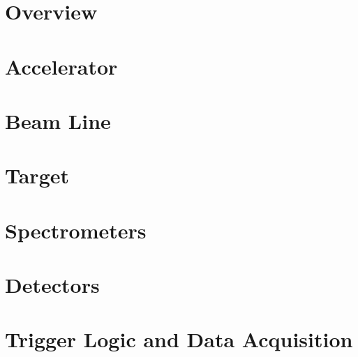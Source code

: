 \label{Chapter-5}

\hypertarget{Section-5.1}{%
\section{Overview}\label{Section-5.1}}

\hypertarget{Section-5.2}{%
\section{Accelerator}\label{Section-5.2}}

\hypertarget{Section-5.3}{%
\section{Beam Line}\label{Section-5.3}}

\hypertarget{Section-5.4}{%
\section{Target}\label{Section-5.4}}

\hypertarget{Section-5.5}{%
\section{Spectrometers}\label{Section-5.5}}

\hypertarget{Section-5.6}{%
\section{Detectors}\label{Section-5.6}}

\hypertarget{Section-5.7}{%
\section{Trigger Logic and Data Acquisition}\label{Section-5.7}}


